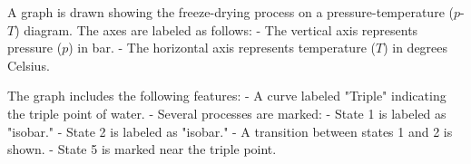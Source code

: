 A graph is drawn showing the freeze-drying process on a pressure-temperature (\( p \)-\( T \)) diagram. The axes are labeled as follows:  
- The vertical axis represents pressure (\( p \)) in bar.  
- The horizontal axis represents temperature (\( T \)) in degrees Celsius.  

The graph includes the following features:  
- A curve labeled "Triple" indicating the triple point of water.  
- Several processes are marked:  
  - State 1 is labeled as "isobar."  
  - State 2 is labeled as "isobar."  
  - A transition between states 1 and 2 is shown.  
  - State 5 is marked near the triple point.